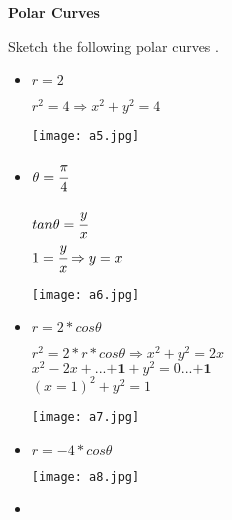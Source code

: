 \noindent{\color{smalt(darkpowderblue)}\rule{\linewidth}{.2mm}}
\large\textbf{{{{Polar Curves}}}} \\
\begin{example}
Sketch the following polar curves .
\begin{itemize}
    \item $ r=2$
    \begin{minipage}{0.5\textwidth}  
    $r^2=4 \Rightarrow x^2+y^2=4$
\end{minipage}
\begin{minipage}{0.5\textwidth}
\texttt{[image: a5.jpg]}
\end{minipage}
    \item $ \theta=\cfrac{\pi}{4}$\\
    \begin{minipage}{0.6\textwidth}
      $tan\theta=\cfrac{y}{x}$\\
      $1=\cfrac{y}{x} \Rightarrow y=x$
\end{minipage}
 \begin{minipage}{0.5\textwidth}
\texttt{[image: a6.jpg]}
\end{minipage}
\item  $r=2*cos\theta$\\
\begin{minipage}{0.6\textwidth}
$r^2=2*r*cos\theta \Rightarrow x^2+y^2=2x$ \\$x^2-2x+...\textbf{+1}+y^2=0 ...\textbf{+1}$ \\$(x=1)^2+y^2=1$
\end{minipage}
\begin{minipage}{0.5\textwidth}
\texttt{[image: a7.jpg]}
\end{minipage}
\item 
\begin{minipage}{0.6\textwidth}
$r=-4*cos\theta$
\end{minipage}
\begin{minipage}{0.5\textwidth}
\texttt{[image: a8.jpg]}\\
\end{minipage}
\item 
\begin{minipage}{0.6\textwidth}

\end{minipage}
\end{itemize}
\end{example}
